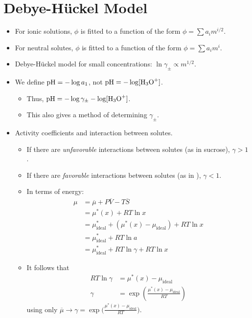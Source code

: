 \documentclass[../notes.tex]{subfiles}
\begin{document}
\section{Debye-H\"{u}ckel Model}
\begin{itemize}
    \item {}For ionic solutions, $\phi$ is fitted to a function of the form $\phi=\sum a_im^{i/2}$.
    \item For neutral solutes, $\phi$ is fitted to a function of the form $\phi=\sum a_im^i$.
    \item Debye-H\"{u}ckel model for small concentrations: $\ln\gamma_\pm\propto m^{1/2}$.
    \item We define $\operatorname{pH}=-\log a_1$, not $\pH=-\log[\ce{H3O+}]$.
    \begin{itemize}
        \item Thus, $\pH=-\log\gamma_\pm-\log[\ce{H3O+}]$.
        \item This also gives a method of determining $\gamma_\pm$.
    \end{itemize}
    \item Activity coefficients and interaction between solutes.
    \begin{itemize}
        \item If there are \emph{unfavorable} interactions between solutes (as in sucrose), $\gamma>1$.
        \item If there are \emph{favorable} interactions between solutes (as in ), $\gamma<1$.
        \item In terms of energy:
        \begin{align*}
            \mu &= \overline{\mu}+P\overline{V}-T\overline{S}\\
            &= \mu^*(x)+RT\ln x\\
            &= \mu^*_\text{ideal}+(\mu^*(x)-\mu_\text{ideal})+RT\ln x\\
            &= \mu^*_\text{ideal}+RT\ln a\\
            &= \mu^*_\text{ideal}+RT\ln\gamma+RT\ln x
        \end{align*}
        \item It follows that
        \begin{align*}
            RT\ln\gamma &= \mu^*(x)-\mu_\text{ideal}\\
            \gamma &= \exp\left( \frac{\mu^*(x)-\mu_\text{ideal}}{RT} \right)
        \end{align*}
        using only $\overline{\mu}\to\gamma=\exp\big( \frac{\mu^*(x)-\mu_\text{ideal}}{RT} \big)$.

\end{itemize}
\end{itemize}
\end{document}
